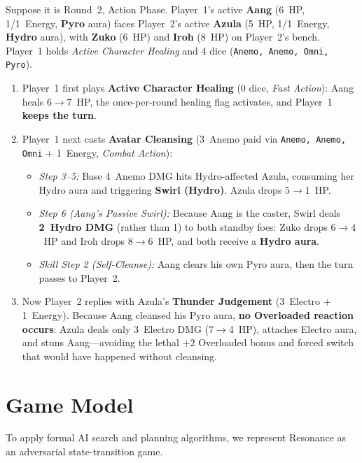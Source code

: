 \documentclass[11pt,a4paper]{article}
\begin{document}
Suppose it is Round~2, Action Phase. Player~1's active \textbf{Aang} (6~HP, 1/1~Energy, \textbf{Pyro} aura) faces Player~2's active \textbf{Azula} (5~HP, 1/1~Energy, \textbf{Hydro} aura), with \textbf{Zuko} (6~HP) and \textbf{Iroh} (8~HP) on Player~2's bench. Player~1 holds \emph{Active Character Healing} and 4 dice (\texttt{Anemo, Anemo, Omni, Pyro}).
\begin{enumerate}[leftmargin=1.4em, itemsep=2pt]
  \item Player~1 first plays \textbf{Active Character Healing} (0 dice, \emph{Fast Action}): Aang heals $6 \to 7$~HP, the once-per-round healing flag activates, and Player~1 \textbf{keeps the turn}.
  \item Player~1 next casts \textbf{Avatar Cleansing} (3~Anemo paid via \texttt{Anemo, Anemo, Omni} + 1~Energy, \emph{Combat Action}):
  \begin{itemize}[leftmargin=1.3em, itemsep=1pt]
    \item \emph{Step 3--5:} Base 4~Anemo DMG hits Hydro-affected Azula, consuming her Hydro aura and triggering \textbf{Swirl (Hydro)}. Azula drops $5 \to 1$~HP.
    \item \emph{Step 6 (Aang's Passive Swirl):} Because Aang is the caster, Swirl deals \textbf{2~Hydro DMG} (rather than 1) to both standby foes: Zuko drops $6 \to 4$~HP and Iroh drops $8 \to 6$~HP, and both receive a \textbf{Hydro aura}.
    \item \emph{Skill Step 2 (Self-Cleanse):} Aang clears his own Pyro aura, then the turn passes to Player~2.
  \end{itemize}
  \item Now Player~2 replies with Azula's \textbf{Thunder Judgement} (3~Electro + 1~Energy). Because Aang cleansed his Pyro aura, \textbf{no Overloaded reaction occurs}: Azula deals only 3~Electro DMG ($7 \to 4$~HP), attaches Electro aura, and stuns Aang—avoiding the lethal $+2$ Overloaded bonus and forced switch that would have happened without cleansing.
\end{enumerate}

\section{Game Model}

To apply formal AI search and planning algorithms, we represent Resonance as an adversarial state-transition game.
\end{document}
